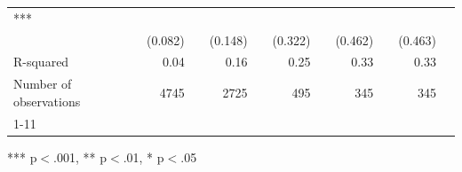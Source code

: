 \documentclass{article}
\begin{document}
\begin{table}[!h]
\begin{tabular}{lllllllllll}
  \multicolumn{1}{l}{***} \\
\multicolumn{1}{l}{} &
  \multicolumn{1}{r}{(0.082)} &
  \multicolumn{1}{l}{} &
  \multicolumn{1}{r}{(0.148)} &
  \multicolumn{1}{l}{} &
  \multicolumn{1}{r}{(0.322)} &
  \multicolumn{1}{l}{} &
  \multicolumn{1}{r}{(0.462)} &
  \multicolumn{1}{l}{} &
  \multicolumn{1}{r}{(0.463)} &
  \multicolumn{1}{l}{} \\
\multicolumn{1}{l}{R-squared} &
  \multicolumn{1}{r}{0.04} &
  \multicolumn{1}{l}{} &
  \multicolumn{1}{r}{0.16} &
  \multicolumn{1}{l}{} &
  \multicolumn{1}{r}{0.25} &
  \multicolumn{1}{l}{} &
  \multicolumn{1}{r}{0.33} &
  \multicolumn{1}{l}{} &
  \multicolumn{1}{r}{0.33} &
  \multicolumn{1}{l}{} \\
\multicolumn{1}{l}{Number of observations} &
  \multicolumn{1}{r}{4745} &
  \multicolumn{1}{l}{} &
  \multicolumn{1}{r}{2725} &
  \multicolumn{1}{l}{} &
  \multicolumn{1}{r}{495} &
  \multicolumn{1}{l}{} &
  \multicolumn{1}{r}{345} &
  \multicolumn{1}{l}{} &
  \multicolumn{1}{r}{345} &
  \multicolumn{1}{l}{} \\
\cline{1-11}
\end{tabular}

\footnotesize{
*** p$<$.001, ** p$<$.01, * p$<$.05
}
\end{table}
\end{document}
